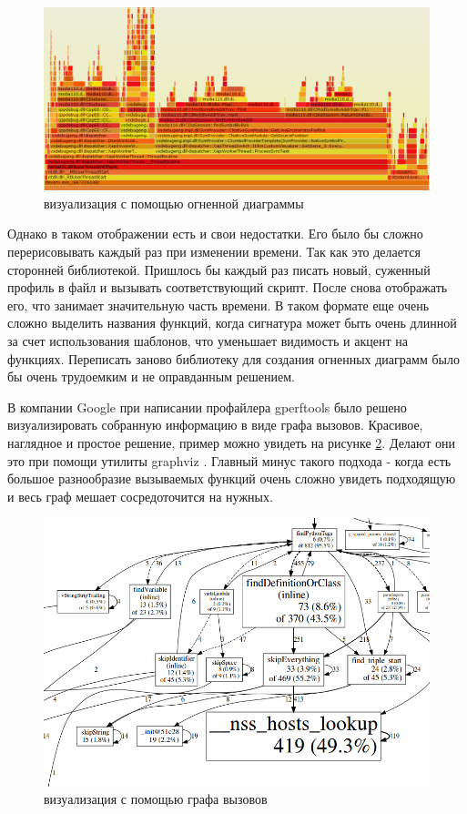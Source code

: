     \begin{figure}[H]
        \caption{визуализация с помощью огненной диаграммы}
        \label{fig:flamegraph}
        \centering
        \includegraphics[scale=0.5]{images/flamegraph}
    \end{figure}
    
	Однако в таком отображении есть и свои недостатки. Его было бы сложно перерисовывать каждый раз при изменении времени. Так как это делается сторонней библиотекой. Пришлось бы каждый раз писать новый, суженный профиль в файл и вызывать соответствующий скрипт. После снова отображать его, что занимает значительную часть времени. В таком формате еще очень сложно выделить названия функций, когда сигнатура может быть очень длинной за счет использования шаблонов, что уменьшает видимость и акцент на функциях. Переписать заново библиотеку для создания огненных диаграмм было бы очень трудоемким и не оправданным решением.
    
    В компании Google при написании профайлера gperftools было решено визуализировать собранную информацию в виде графа вызовов. Красивое, наглядное и простое решение, пример можно увидеть на рисунке \ref{fig:callgraph}. Делают они это при помощи утилиты graphviz \cite{graphviz}. Главный минус такого подхода - когда есть большое разнообразие вызываемых функций очень сложно увидеть подходящую и весь граф мешает сосредоточится на нужных. 
	
    \begin{figure}[H]
        \caption{визуализация с помощью графа вызовов}
        \label{fig:callgraph}
        \centering
        \includegraphics[scale=0.5]{images/callgraph}
    \end{figure}
    
